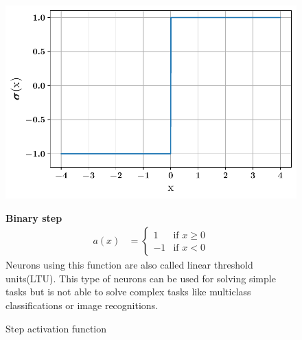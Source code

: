 \begin{figure}[!h]
\begin{minipage}{0.45\textwidth}

    \centering
\includegraphics[width=\textwidth]{images/networks/act_step.pdf}
\caption{Step activation function}
    \label{fig:act_step}
\end{minipage}
\hfill
\begin{minipage}{0.5\textwidth}
    \textbf{Binary step}
      \begin{align}
        a(x) &=
        \begin{cases}
        1   & \text{if } x \geq 0 \\
        -1  & \text{if } x < 0 
  \end{cases}
\end{align}
Neurons using this function are also called linear threshold units(LTU). This type of neurons can be used for solving simple tasks but is not able to solve complex tasks like multiclass classifications or image recognitions.
\end{minipage}
    \end{figure}

